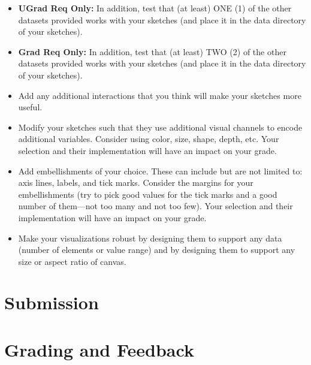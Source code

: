 \documentclass[a4paper,12pt]{article}
\begin{document}
\begin{itemize}
\item \textbf{UGrad Req Only:} In addition, test that (at least) ONE (1) of the other datasets provided works with your sketches (and place it in the data directory of your sketches).

\item \textbf{Grad Req Only:} In addition, test that (at least) TWO (2) of the other datasets provided works with your sketches (and place it in the data directory of your sketches).

\item Add any additional interactions that you think will make your sketches more useful.

\item Modify your sketches such that they use additional visual channels to encode additional variables. Consider using color, size, shape, depth, etc. Your selection and their implementation will have an impact on your grade.

\item Add embellishments of your choice. These can include but are not limited to: axis lines, labels, and tick marks. Consider the margins for your embellishments (try to pick good values for the tick marks and a good number of them---not too many and not too few). Your selection and their implementation will have an impact on your grade.

\item Make your visualizations robust by designing them to support any data (number of elements or value range) and by designing them to support any size or aspect ratio of canvas.

\end{itemize}


\section{Submission}


\section{Grading and Feedback}
\end{document}
